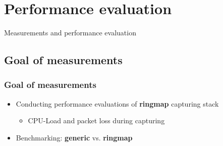 \documentclass{beamer}
\begin{document}
\section{Performance evaluation}
\begin{frame}
	\begin{center}
	\huge{Measurements and performance evaluation}
	\end{center}
\end{frame}

\subsection*{Goal of measurements}

\begin{frame}
\frametitle{Goal of measurements}
\begin{itemize}
	\item Conducting performance evaluations of \textbf{ringmap} capturing stack
		\begin{itemize}
			\item CPU-Load and packet loss during capturing\newline
		\end{itemize}
	\item Benchmarking: \textbf{generic} vs. \textbf{ringmap}
\end{itemize}
\end{frame}
\end{document}
